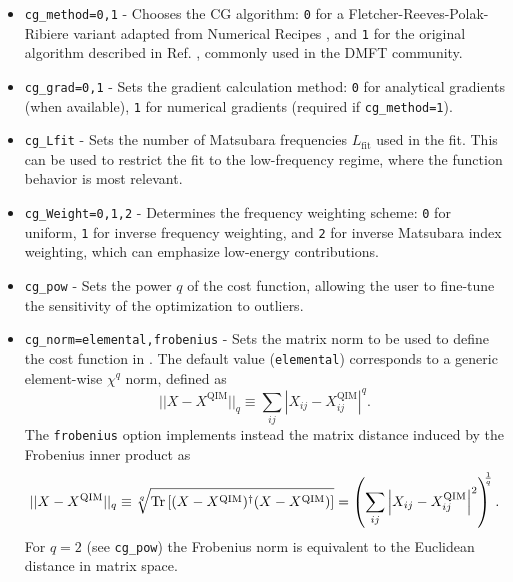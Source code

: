 \documentclass[edipack_sp.tex]{subfiles}
\begin{document}
\begin{itemize}
\item \texttt{cg\_method=0,1} - Chooses the CG algorithm: 
\texttt{0} for a Fletcher-Reeves-Polak-Ribiere variant adapted from 
Numerical Recipes \cite{NumRec77}, and \texttt{1} for the original 
algorithm described in Ref. \cite{Georges1996RMP}, commonly used 
in the DMFT community.
\item \texttt{cg\_grad=0,1} - Sets the gradient calculation method: 
\texttt{0} for analytical gradients (when available), \texttt{1} for 
numerical gradients (required if \texttt{cg\_method=1}).
\item \texttt{cg\_Lfit} - Sets the number of Matsubara frequencies 
$L_\mathrm{fit}$ used in the fit. This can be used to restrict the 
fit to the low-frequency regime, where the function behavior is 
most relevant.
\item \texttt{cg\_Weight=0,1,2} - Determines the frequency weighting 
scheme: \texttt{0} for uniform, \texttt{1} for inverse frequency 
weighting, and \texttt{2} for inverse Matsubara index weighting, which 
can emphasize low-energy contributions.
\item \texttt{cg\_pow} - Sets the power $q$ of the cost function, 
allowing the user to fine-tune the sensitivity of the optimization 
to outliers.
\item \texttt{cg\_norm=elemental,frobenius} - Sets the matrix norm to be used to define the cost function in . The default value (\texttt{elemental}) corresponds to a generic element-wise $\chi^q$ norm, defined as 
\begin{equation*}
    ||X-X^\mathrm{QIM}||_q \equiv {\sum_{ij} \left|X_{ij}-X^\mathrm{QIM}_{ij}\right|^q}.
\end{equation*}
The \texttt{frobenius} option implements instead the matrix distance induced by the Frobenius inner product as
\begin{equation*}
    ||X-X^\mathrm{QIM}||_q \equiv 
    \sqrt[q]{{\rm Tr}\left[(X-X^\mathrm{QIM})^\dagger(X-X^\mathrm{QIM})\right]} =
    \left(\sum_{ij} \left|X_{ij}-X^\mathrm{QIM}_{ij}\right|^2 \right)^{\!\!\!\frac{1}{q}}.
\end{equation*}
For $q=2$ (see \texttt{cg\_pow}) the Frobenius norm is equivalent
to the Euclidean distance in matrix space. 

\end{itemize}
\end{document}
